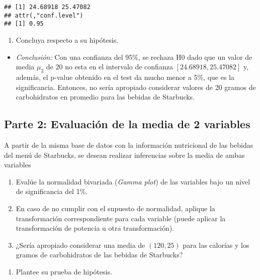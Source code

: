 \documentclass[
]{article}
\providecommand{\tightlist}{%
  \setlength{\itemsep}{0pt}\setlength{\parskip}{0pt}}
\begin{document}
\begin{verbatim}
## [1] 24.68918 25.47082
## attr(,"conf.level")
## [1] 0.95
\end{verbatim}

\begin{enumerate}
\def\labelenumi{\alph{enumi}.}
\setcounter{enumi}{3}
\tightlist
\item
  Concluya respecto a su hipótesis.
\end{enumerate}

\begin{itemize}
\tightlist
\item
  \emph{Conclusión:} Con una confianza del 95\%, se rechaza H0 dado que
  un valor de media \(\mu_2\) de \(20\) no esta en el intervalo de
  confianza \([24.68918, 25.47082]\) y, además, el p-value obtenido en
  el test da mucho menor a 5\%, que es la significancia. Entonces, no
  sería apropiado considerar valores de 20 gramos de carbohidratos en
  promedio para las bebidas de Starbucks.
\end{itemize}

\subsection{Parte 2: Evaluación de la media de 2
variables}\label{parte-2-evaluaciuxf3n-de-la-media-de-2-variables}

A partir de la misma base de datos con la información nutricional de las
bebidas del menú de Starbucks, se desean realizar inferencias sobre la
media de ambas variables

\begin{enumerate}
\def\labelenumi{\arabic{enumi}.}
\item
  Evalúe la normalidad bivariada (\emph{Gamma plot}) de las variables
  bajo un nivel de significancia del 1\%.
\item
  En caso de no cumplir con el supuesto de normalidad, aplique la
  transformación correspondiente para cada variable (puede aplicar la
  transformación de potencia u otra transformación).
\item
  ¿Sería apropiado considerar una media de \((120,25)\) para las
  calorías y los gramos de carbohidratos de las bebidas de Starbucks?
\end{enumerate}

\begin{enumerate}
\def\labelenumi{\alph{enumi}.}
\tightlist
\item
  Plantee su prueba de hipótesis.
\end{enumerate}
\end{document}
